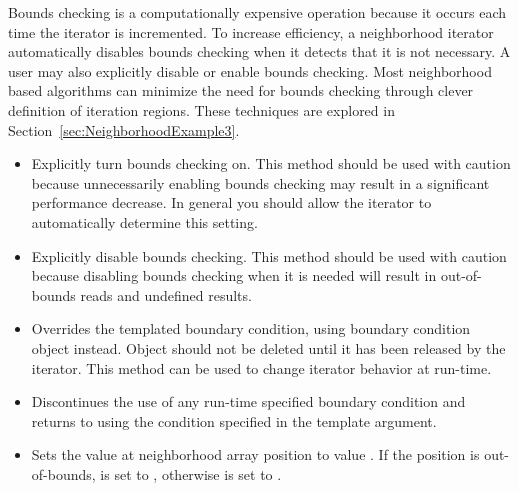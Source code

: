 {Bounds checking is a computationally expensive operation because it occurs each
time the iterator is incremented.  To increase efficiency, a neighborhood
iterator automatically disables bounds checking when it detects that it is
not necessary.  A user may also explicitly disable or enable bounds checking.
Most neighborhood based algorithms can minimize the need for bounds checking
through clever definition of iteration regions.  These techniques are explored
in Section~\ref{sec:NeighborhoodExample3}.

\begin{itemize}

\item \textbf{} Explicitly turn
bounds checking on.  This method should be used with caution because
unnecessarily enabling bounds checking may result in a significant performance
decrease. In general you should allow the iterator to automatically determine
this setting.

\item \textbf{} Explicitly disable
bounds checking. This method should be used with caution because disabling
bounds checking when it is needed will result in out-of-bounds reads and
undefined results.

\item \textbf{} 
Overrides the templated boundary condition, using boundary condition
object  instead. Object  should not be deleted until
it has been released by the iterator.  This method can be used to
change iterator behavior at run-time.

\item \textbf{} Discontinues the use of any
run-time specified boundary condition and returns to using the condition
specified in the template argument.

\item \textbf{} Sets the value at neighborhood array position  to value
.  If the position  is out-of-bounds,  is set to
, otherwise  is set to .
\end{itemize}

}
